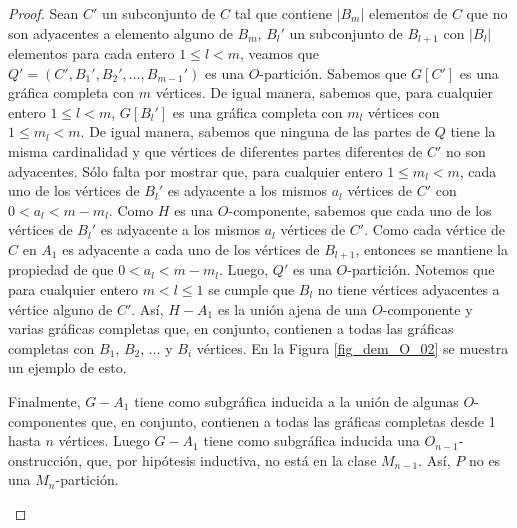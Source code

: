 \begin{proof}
Sean $C'$ un subconjunto de $C$ tal que contiene $|B_m|$ elementos de $C$ que no son adyacentes a elemento alguno de $B_m$, $B_l'$ un subconjunto de $B_{l+1}$ con $|B_l|$ elementos para cada entero $1\le l < m$, veamos que $Q'=(C',B_1', B_2', \dots, B_{m-1}')$ es una $O$-partición. Sabemos que $G[C']$ es una gráfica completa con $m$ vértices. De igual manera, sabemos que, para cualquier entero $1\le l < m$, $G[B_l']$ es una gráfica completa con $m_l$ vértices con $1\le m_l < m$. De igual manera, sabemos que ninguna de las partes de $Q$ tiene la misma cardinalidad y que vértices de diferentes partes diferentes de $C'$ no son adyacentes. Sólo falta por mostrar que, para cualquier entero $1\le m_l < m$, cada uno de los vértices de $B_l'$ es adyacente a los mismos $a_l$ vértices de $C'$ con $0< a_l < m - m_l$. Como $H$ es una $O$-componente, sabemos que cada uno de los vértices de $B_l'$ es adyacente a los mismos $a_l$ vértices de $C'$. Como cada vértice de $C$ en $A_1$ es adyacente a cada uno de los vértices de $B_{l+1}$, entonces se mantiene la propiedad de que $0< a_l < m - m_l$. Luego, $Q'$ es una $O$-partición. Notemos que para cualquier entero $m<l\le 1$ se cumple que $B_l$ no tiene vértices adyacentes a vértice alguno de $C'$. Así, $H-A_1$ es la unión ajena de una $O$-componente y varias gráficas completas que, en conjunto, contienen a todas las gráficas completas con $B_1$, $B_2$, $\dots$ y $B_i$ vértices. En la Figura \ref{fig_dem_O_02} se muestra un ejemplo de esto.

Finalmente, $G-A_1$ tiene como subgráfica inducida a la unión de algunas $O$-componentes que, en conjunto, contienen a todas las gráficas completas desde 1 hasta $n$ vértices. Luego $G-A_1$ tiene como subgráfica inducida una $O_{n-1}$-onstrucción, que, por hipótesis inductiva, no está en la clase $M_{n-1}$. Así, $P$ no es una $M_n$-partición.

\begin{figure}[ht!]

\begin{subfigure}{\textwidth}
\begin{center}
\end{center}
\end{subfigure}
\end{figure}
\end{proof}
